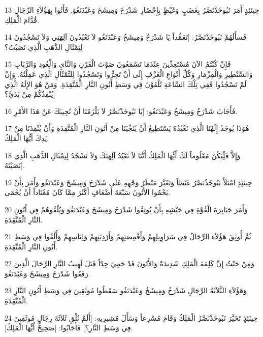 \par 13 حِينَئِذٍ أَمَرَ نَبُوخَذْنَصَّرُ بِغَضَبٍ وَغَيْظٍ بِإِحْضَارِ شَدْرَخَ وَمِيشَخَ وَعَبْدَنَغُوَ. فَأَتُوا بِهَؤُلاَءِ الرِّجَالِ قُدَّامَ الْمَلِكِ.
\par 14 فَسأَلَهُمْ نَبُوخَذْنَصَّرُ: [تَعَمُّداً يَا شَدْرَخُ وَمِيشَخُ وَعَبْدَنَغُو لاَ تَعْبُدُونَ آلِهَتِي وَلاَ تَسْجُدُونَ لِتِمْثَالِ الذَّهَبِ الَّذِي نَصَبْتُ؟
\par 15 فَإِنْ كُنْتُمُ الآنَ مُسْتَعِدِّينَ عِنْدَمَا تَسْمَعُونَ صَوْتَ الْقَرْنِ وَالنَّايِ وَالْعُودِ وَالرَّبَابِ وَالسِّنْطِيرِ وَالْمِزْمَارِ وَكُلِّ أَنْوَاعِ الْعَزْفِ إِلَى أَنْ تَخِرُّوا وَتَسْجُدُوا لِلتِّمْثَالِ الَّذِي عَمِلْتُهُ. وَإِنْ لَمْ تَسْجُدُوا فَفِي تِلْكَ السَّاعَةِ تُلْقَوْنَ فِي وَسَطِ أَتُونِ النَّارِ الْمُتَّقِدَةِ. وَمَنْ هُوَ الإِلَهُ الَّذِي يُنْقِذُكُمْ مِنْ يَدَيَّ؟]
\par 16 فَأَجَابَ شَدْرَخُ وَمِيشَخُ وَعَبْدَنَغُو: [يَا نَبُوخَذْنَصَّرُ لاَ يَلْزَمُنَا أَنْ نُجِيبَكَ عَنْ هَذَا الأَمْرِ.
\par 17 هُوَذَا يُوجَدُ إِلَهُنَا الَّذِي نَعْبُدُهُ يَسْتَطِيعُ أَنْ يُنَجِّيَنَا مِنْ أَتُونِ النَّارِ الْمُتَّقِدَةِ وَأَنْ يُنْقِذَنَا مِنْ يَدِكَ أَيُّهَا الْمَلِكُ.
\par 18 وَإِلاَّ فَلِْيَكُنْ مَعْلُوماً لَكَ أَيُّهَا الْمَلِكُ أَنَّنَا لاَ نَعْبُدُ آلِهَتَكَ وَلاَ نَسْجُدُ لِتِمْثَالِ الذَّهَبِ الَّذِي نَصَبْتَهُ].
\par 19 حِينَئِذٍ امْتَلَأَ نَبُوخَذْنَصَّرُ غَيْظاً وَتَغَيَّرَ مَنْظَرُ وَجْهِهِ عَلَى شَدْرَخَ وَمِيشَخَ وَعَبْدَنَغُو وَأَمَرَ بِأَنْ يَحْمُوا الأَتُونَ سَبْعَةَ أَضْعَافٍ أَكْثَرَ مِمَّا كَانَ مُعْتَاداً أَنْ يُحْمَى.
\par 20 وَأَمَرَ جَبَابِرَةَ الْقُوَّةِ فِي جَيْشِهِ بِأَنْ يُوثِقُوا شَدْرَخَ وَمِيشَخَ وَعَبْدَنَغُوَ وَيُلْقُوهُمْ فِي أَتُونِ النَّارِ الْمُتَّقِدَةِ.
\par 21 ثُمَّ أُوثِقَ هَؤُلاَءِ الرِّجَالُ فِي سَرَاوِيلِهِمْ وَأَقْمِصَتِهِمْ وَأَرْدِيَتِهِمْ وَلِبَاسِهِمْ وَأُلْقُوا فِي وَسَطِ أَتُونِ النَّارِ الْمُتَّقِدَةِ.
\par 22 وَمِنْ حَيْثُ إِنَّ كَلِمَةَ الْمَلِكِ شَدِيدَةٌ وَالأَتُونَ قَدْ حَمِيَ جِدّاً قَتَلَ لَهِيبُ النَّارِ الرِّجَالَ الَّذِينَ رَفَعُوا شَدْرَخَ وَمِيشَخَ وَعَبْدَنَغُوَ.
\par 23 وَهَؤُلاَءِ الثَّلاَثَةُ الرِّجَالِ شَدْرَخُ وَمِيشَخُ وَعَبْدَنَغُو سَقَطُوا مُوثَقِينَ فِي وَسَطِ أَتُونِ النَّارِ الْمُتَّقِدَةِ.
\par 24 حِينَئِذٍ تَحَيَّرَ نَبُوخَذْنَصَّرُ الْمَلِكُ وَقَامَ مُسْرِعاً وَسَأَلَ مُشِيرِيهِ: [أَلَمْ نُلْقِ ثَلاَثَةَ رِجَالٍ مُوثَقِينَ فِي وَسَطِ النَّارِ؟] فَأَجَابُوا: [صَحِيحٌ أَيُّهَا الْمَلِكُ].
